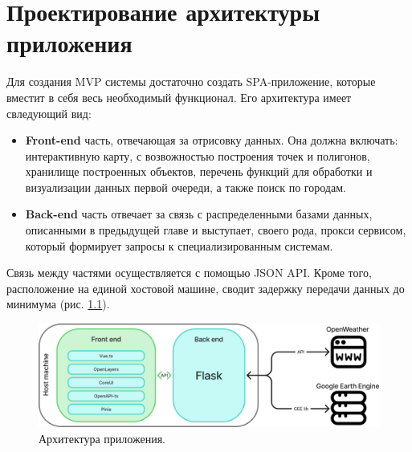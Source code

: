 \chapter{Проектирование архитектуры приложения}
Для создания MVP системы достаточно создать SPA-приложение, которые вместит в себя весь необходимый функционал.
Его архитектура имеет свледующий вид:
\begin{itemize}
	\item \textbf{Front-end} часть, отвечающая за отрисовку данных. Она должна включать: интерактивную карту, с возвожностью построения точек и полигонов, хранилище построенных объектов, перечень функций для обработки и визуализации данных первой очереди, а также поиск по городам.
	\item \textbf{Back-end} часть отвечает за связь с распределенными базами данных, описанными в предыдущей главе и выступает, своего рода, прокси сервисом, который формирует запросы к специализированным системам.
\end{itemize}

Связь между частями осуществляется с помощью JSON API. Кроме того, расположение на единой хостовой машине, сводит задержку передачи данных до минимума (рис. \ref{fig:archecture}).

\begin{figure}[h]  %
	\centering
	\includegraphics[height=0.3\textwidth]{imgs/arch.png}  %
	\caption{Архитектура приложения.}  %
	\label{fig:archecture}  %
\end{figure}
